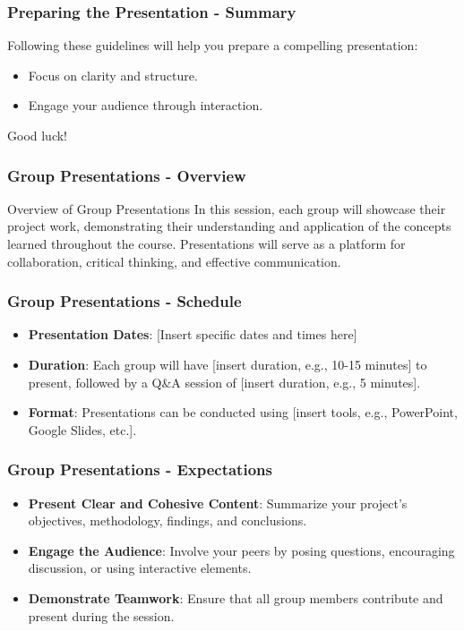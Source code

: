 \documentclass{beamer}
\begin{document}
\begin{frame}[fragile]
    \frametitle{Preparing the Presentation - Summary}
    Following these guidelines will help you prepare a compelling presentation:
    \begin{itemize}
        \item Focus on clarity and structure.
        \item Engage your audience through interaction.
    \end{itemize}
    Good luck!
\end{frame}

\begin{frame}[fragile]
    \frametitle{Group Presentations - Overview}
    \begin{block}{Overview of Group Presentations}
        In this session, each group will showcase their project work, demonstrating their understanding and application of the concepts learned throughout the course. 
        Presentations will serve as a platform for collaboration, critical thinking, and effective communication.
    \end{block}
\end{frame}

\begin{frame}[fragile]
    \frametitle{Group Presentations - Schedule}
    \begin{itemize}
        \item \textbf{Presentation Dates}: [Insert specific dates and times here]
        \item \textbf{Duration}: Each group will have [insert duration, e.g., 10-15 minutes] to present, followed by a Q\&A session of [insert duration, e.g., 5 minutes].
        \item \textbf{Format}: Presentations can be conducted using [insert tools, e.g., PowerPoint, Google Slides, etc.].
    \end{itemize}
\end{frame}

\begin{frame}[fragile]
    \frametitle{Group Presentations - Expectations}
    \begin{itemize}
        \item \textbf{Present Clear and Cohesive Content}: Summarize your project’s objectives, methodology, findings, and conclusions.
        \item \textbf{Engage the Audience}: Involve your peers by posing questions, encouraging discussion, or using interactive elements.
        \item \textbf{Demonstrate Teamwork}: Ensure that all group members contribute and present during the session.
    \end{itemize}
\end{frame}
\end{document}
